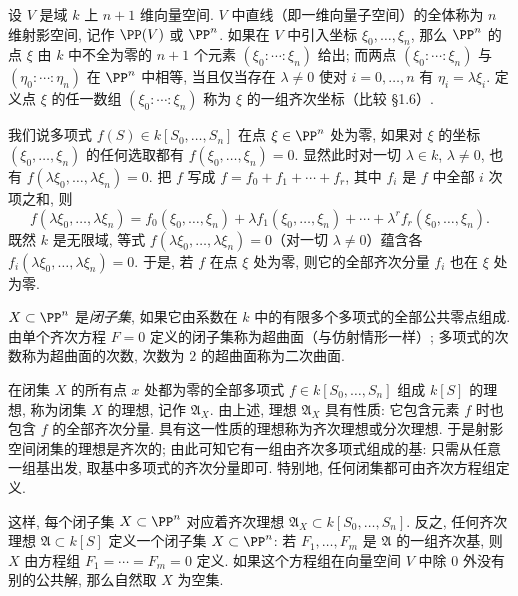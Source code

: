 设 $V$ 是域 $k$ 上 $n+1$ 维向量空间. $V$ 中直线（即一维向量子空间）的全体称为 $n$ 维射影空间, 记作 $\PP(V)$ 或 $\PP^n$. 如果在 $V$ 中引入坐标 $\xi_0, \ldots, \xi_n$, 那么 $\PP^n$ 的点 $\xi$ 由 $k$ 中不全为零的 $n+1$ 个元素 $(\xi_0 : \cdots : \xi_n)$ 给出; 而两点 $(\xi_0 : \cdots : \xi_n)$ 与 $(\eta_0 : \cdots : \eta_n)$ 在 $\PP^n$ 中相等, 当且仅当存在 $\lambda \ne 0$ 使对 $i = 0, \ldots, n$ 有 $\eta_i = \lambda \xi_i$. 定义点 $\xi$ 的任一数组 $(\xi_0 : \cdots : \xi_n)$ 称为 $\xi$ 的一组齐次坐标（比较 §1.6）.

我们说多项式 $f(S) \in k[S_0, \ldots, S_n]$ 在点 $\xi \in \PP^n$ 处为零, 如果对 $\xi$ 的坐标 $(\xi_0, \ldots, \xi_n)$ 的任何选取都有 $f(\xi_0, \ldots, \xi_n) = 0$. 显然此时对一切 $\lambda \in k$, $\lambda \ne 0$, 也有 $f(\lambda\xi_0, \ldots, \lambda\xi_n) = 0$. 把 $f$ 写成 $f = f_0 + f_1 + \cdots + f_r$, 其中 $f_i$ 是 $f$ 中全部 $i$ 次项之和, 则
\[
	f(\lambda\xi_0, \ldots, \lambda\xi_n) = f_0(\xi_0, \ldots, \xi_n) + \lambda f_1(\xi_0, \ldots, \xi_n) + \cdots + \lambda^r f_r(\xi_0, \ldots, \xi_n).
\]
既然 $k$ 是无限域, 等式 $f(\lambda\xi_0, \ldots, \lambda\xi_n) = 0$（对一切 $\lambda \ne 0$）蕴含各 $f_i(\lambda\xi_0, \ldots, \lambda\xi_n) = 0$. 于是, 若 $f$ 在点 $\xi$ 处为零, 则它的全部齐次分量 $f_i$ 也在 $\xi$ 处为零.


\begin{definition}[射影闭子集]\label{def:projective-closed-subset}
	$X \subset \PP^n$ 是\emph{闭子集}, 如果它由系数在 $k$ 中的有限多个多项式的全部公共零点组成. 由单个齐次方程 $F = 0$ 定义的闭子集称为超曲面（与仿射情形一样）; 多项式的次数称为超曲面的次数, 次数为 $2$ 的超曲面称为二次曲面.
\end{definition}

在闭集 $X$ 的所有点 $x$ 处都为零的全部多项式 $f \in k[S_0, \ldots, S_n]$ 组成 $k[S]$ 的理想, 称为闭集 $X$ 的理想, 记作 $\mathfrak A_X$. 由上述, 理想 $\mathfrak A_X$ 具有性质: 它包含元素 $f$ 时也包含 $f$ 的全部齐次分量. 具有这一性质的理想称为齐次理想或分次理想. 于是射影空间闭集的理想是齐次的; 由此可知它有一组由齐次多项式组成的基: 只需从任意一组基出发, 取基中多项式的齐次分量即可. 特别地, 任何闭集都可由齐次方程组定义.

这样, 每个闭子集 $X \subset \PP^n$ 对应着齐次理想 $\mathfrak A_X \subset k[S_0, \ldots, S_n]$. 反之, 任何齐次理想 $\mathfrak A \subset k[S]$ 定义一个闭子集 $X \subset \PP^n$: 若 $F_1, \ldots, F_m$ 是 $\mathfrak A$ 的一组齐次基, 则 $X$ 由方程组 $F_1 = \cdots = F_m = 0$ 定义. 如果这个方程组在向量空间 $V$ 中除 $0$ 外没有别的公共解, 那么自然取 $X$ 为空集.

